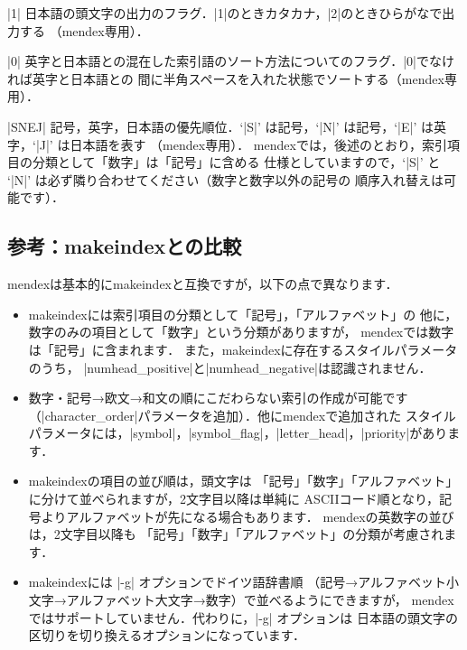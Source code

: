 \documentclass[a4paper]{jsarticle}
\newcommand{\SoftName}[1]{\textsf{#1}}
\begin{document}
\begin{description}[leftmargin=3.5cm]
\item[|letter\string_head|] \ParamNum|1|
日本語の頭文字の出力のフラグ．|1|のときカタカナ，|2|のときひらがなで出力する
（\SoftName{mendex}専用）．

\item[|priority|] \ParamNum|0|
英字と日本語との混在した索引語のソート方法についてのフラグ．|0|でなければ英字と日本語との
間に半角スペースを入れた状態でソートする（\SoftName{mendex}専用）．

\item[|character\string_order|] \ParamString*|SNEJ|
記号，英字，日本語の優先順位．`|S|' は記号，`|N|' は記号，`|E|' は英字，`|J|' は日本語を表す
（\SoftName{mendex}専用）．
\SoftName{mendex}では，後述のとおり，索引項目の分類として「数字」は「記号」に含める
仕様としていますので，`|S|' と `|N|' は必ず隣り合わせてください（数字と数字以外の記号の
順序入れ替えは可能です）．
\end{description}

\subsection{参考：\SoftName{makeindex}との比較}
\SoftName{mendex}は基本的に\SoftName{makeindex}と互換ですが，以下の点で異なります．

\begin{itemize}
\item \SoftName{makeindex}には索引項目の分類として「記号」，「アルファベット」の
  他に，数字のみの項目として「数字」という分類がありますが，
  \SoftName{mendex}では数字は「記号」に含まれます．
  また，\SoftName{makeindex}に存在するスタイルパラメータのうち，
  |numhead_positive|と|numhead_negative|は認識されません．

\item 数字・記号→欧文→和文の順にこだわらない索引の作成が可能です
  （|character_order|パラメータを追加）．他に\SoftName{mendex}で追加された
  スタイルパラメータには，|symbol|，|symbol_flag|，|letter_head|，|priority|があります．

\item \SoftName{makeindex}の項目の並び順は，頭文字は
  「記号」「数字」「アルファベット」に分けて並べられますが，2文字目以降は単純に
  ASCIIコード順となり，記号よりアルファベットが先になる場合もあります．
  \SoftName{mendex}の英数字の並びは，2文字目以降も
  「記号」「数字」「アルファベット」の分類が考慮されます．

\item \SoftName{makeindex}には |-g| オプションでドイツ語辞書順
  （記号→アルファベット小文字→アルファベット大文字→数字）で並べるようにできますが，
  \SoftName{mendex}ではサポートしていません．代わりに，|-g| オプションは
  日本語の頭文字の区切りを切り換えるオプションになっています．
\end{itemize}
\end{document}
